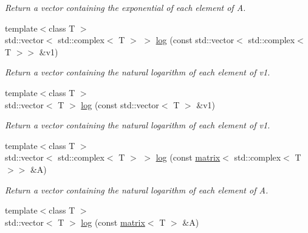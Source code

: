 \begin{DoxyCompactItemize}
\begin{DoxyCompactList}\small\item\em Return a vector containing the exponential of each element of A. \end{DoxyCompactList}\item 
\hypertarget{namespacekeycpp_a95843ef0a09d799d8b62eb7b91e9c02f}{{\footnotesize template$<$class T $>$ }\\std\-::vector$<$ std\-::complex$<$ T $>$ $>$ \hyperlink{namespacekeycpp_a95843ef0a09d799d8b62eb7b91e9c02f}{log} (const std\-::vector$<$ std\-::complex$<$ T $>$$>$ \&v1)}\label{namespacekeycpp_a95843ef0a09d799d8b62eb7b91e9c02f}

\begin{DoxyCompactList}\small\item\em Return a vector containing the natural logarithm of each element of v1. \end{DoxyCompactList}\item 
\hypertarget{namespacekeycpp_a8239f43008337eeab762bc1c7414e735}{{\footnotesize template$<$class T $>$ }\\std\-::vector$<$ T $>$ \hyperlink{namespacekeycpp_a8239f43008337eeab762bc1c7414e735}{log} (const std\-::vector$<$ T $>$ \&v1)}\label{namespacekeycpp_a8239f43008337eeab762bc1c7414e735}

\begin{DoxyCompactList}\small\item\em Return a vector containing the natural logarithm of each element of v1. \end{DoxyCompactList}\item 
\hypertarget{namespacekeycpp_aba78d97ea38234b858fffc97b05e6925}{{\footnotesize template$<$class T $>$ }\\std\-::vector$<$ std\-::complex$<$ T $>$ $>$ \hyperlink{namespacekeycpp_aba78d97ea38234b858fffc97b05e6925}{log} (const \hyperlink{classkeycpp_1_1matrix}{matrix}$<$ std\-::complex$<$ T $>$$>$ \&A)}\label{namespacekeycpp_aba78d97ea38234b858fffc97b05e6925}

\begin{DoxyCompactList}\small\item\em Return a vector containing the natural logarithm of each element of A. \end{DoxyCompactList}\item 
\hypertarget{namespacekeycpp_ab1c65fb4ee4ceaf869361f4fb6fef3dd}{{\footnotesize template$<$class T $>$ }\\std\-::vector$<$ T $>$ \hyperlink{namespacekeycpp_ab1c65fb4ee4ceaf869361f4fb6fef3dd}{log} (const \hyperlink{classkeycpp_1_1matrix}{matrix}$<$ T $>$ \&A)}\label{namespacekeycpp_ab1c65fb4ee4ceaf869361f4fb6fef3dd}


\end{DoxyCompactItemize}
